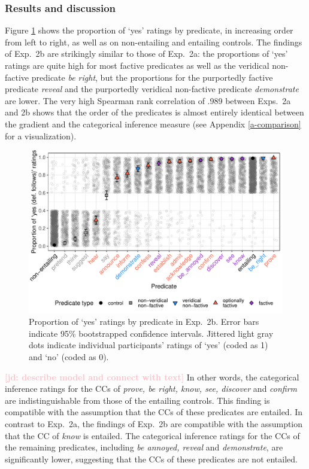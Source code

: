 \documentclass[11pt,fleqn]{article}
\newcommand{\jd}[1]{\textbf{\textcolor{Pink}{[jd: #1]}}}
\newcommand{\6}{\mbox{$[\hspace*{-.6mm}[$}}
\newcommand{\9}{\mbox{$]\hspace*{-.6mm}]$}}
\begin{document}
\subsubsection{Results and discussion}

Figure \ref{fig:2bresults} shows the proportion of `yes' ratings by predicate, in increasing order from left to right, as well as on non-entailing and entailing controls. The findings of Exp.~2b are strikingly similar to those of Exp.~2a: the proportions of `yes' ratings are quite high for most factive predicates as well as the veridical non-factive predicate {\em be right}, but the proportions for the purportedly factive predicate {\em reveal} and the purportedly veridical non-factive predicate {\em demonstrate} are lower. The very high Spearman rank correlation of .989 between Exps.~2a and 2b shows that the order of the predicates is almost entirely identical between the gradient and the categorical inference measure (see Appendix \ref{a-comparison} for a visualization). 
 
\begin{figure}[H]
\centering
\includegraphics[width=.7\paperwidth]{../../results/7-veridicality3-binary/graphs/proportion-by-predicate-variability-individual}

\caption{Proportion of `yes' ratings by predicate in Exp.~2b. Error bars indicate 95\% bootstrapped confidence intervals. Jittered light gray dots indicate individual participants' ratings of `yes' (coded as 1) and `no' (coded as 0).}
\label{fig:2bresults}
\end{figure}

\jd{describe model and connect with text} In other words, the categorical inference ratings for the CCs of {\em prove, be right, know, see, discover} and {\em confirm} are indistinguishable from those of the entailing controls. This finding is compatible with the assumption that the CCs of these predicates are entailed. In contrast to Exp.~2a, the findings of Exp.~2b are compatible with the assumption that the CC of {\em know} is entailed. The categorical inference ratings for the CCs of the remaining predicates, including {\em be annoyed, reveal} and {\em demonstrate}, are significantly lower, suggesting that the CCs of these predicates are not entailed.
\end{document}
